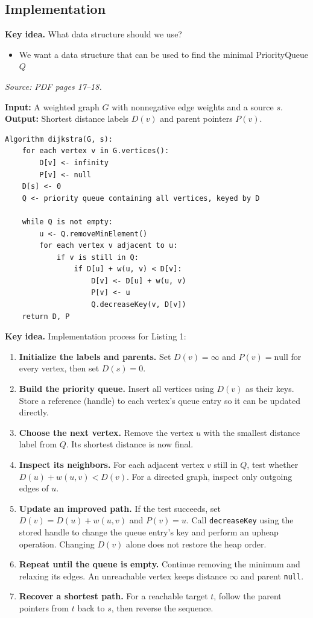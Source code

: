 \documentclass[11pt,letterpaper]{article}
\newcommand{\sourcepages}[1]{\textit{Source: PDF pages #1.}}
\newcommand{\keyidea}[1]{\par\textbf{Key idea.} #1\par}
\newcommand{\method}[1]{\texttt{#1}}
\begin{document}
\subsection{Implementation}
\keyidea{What data structure should we use?}
\begin{itemize}
    \item We want a data structure that can be used to find the minimal \textrightarrow PriorityQueue $Q$ 
\end{itemize}
\sourcepages{17--18}

\textbf{Input:} A weighted graph $G$ with nonnegative edge weights and a source $s$.
\textbf{Output:} Shortest distance labels $D(v)$ and parent pointers $P(v)$.
\begin{lstlisting}[caption={Dijkstra's algorithm using an adaptable priority queue}]
Algorithm dijkstra(G, s):
    for each vertex v in G.vertices():
        D[v] <- infinity
        P[v] <- null
    D[s] <- 0
    Q <- priority queue containing all vertices, keyed by D

    while Q is not empty:
        u <- Q.removeMinElement()
        for each vertex v adjacent to u:
            if v is still in Q:
                if D[u] + w(u, v) < D[v]:
                    D[v] <- D[u] + w(u, v)
                    P[v] <- u
                    Q.decreaseKey(v, D[v])
    return D, P
\end{lstlisting}

\keyidea{Implementation process for Listing 1:}
\begin{enumerate}
    \item \textbf{Initialize the labels and parents.} Set $D(v)=\infty$ and $P(v)=\text{null}$ for every vertex, then set $D(s)=0$.
    \item \textbf{Build the priority queue.} Insert all vertices using $D(v)$ as their keys. Store a reference (handle) to each vertex's queue entry so it can be updated directly.
    \item \textbf{Choose the next vertex.} Remove the vertex $u$ with the smallest distance label from $Q$. Its shortest distance is now final.
    \item \textbf{Inspect its neighbors.} For each adjacent vertex $v$ still in $Q$, test whether $D(u)+w(u,v)<D(v)$. For a directed graph, inspect only outgoing edges of $u$.
    \item \textbf{Update an improved path.} If the test succeeds, set $D(v)=D(u)+w(u,v)$ and $P(v)=u$. Call \method{decreaseKey} using the stored handle to change the queue entry's key and perform an upheap operation. Changing $D(v)$ alone does not restore the heap order.
    \item \textbf{Repeat until the queue is empty.} Continue removing the minimum and relaxing its edges. An unreachable vertex keeps distance $\infty$ and parent \method{null}.
    \item \textbf{Recover a shortest path.} For a reachable target $t$, follow the parent pointers from $t$ back to $s$, then reverse the sequence.
\end{enumerate}
\end{document}
